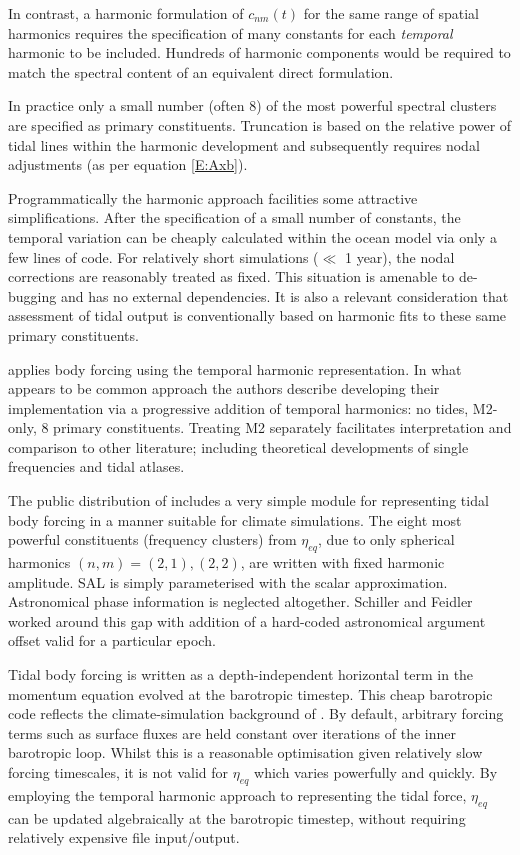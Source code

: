 In contrast, a harmonic formulation of $c_{nm}(t)$ for the same range of spatial harmonics requires the specification of many constants for each \emph{temporal} harmonic to be included.  
Hundreds of harmonic components \citep[pp3]{Desai:2006wo} would be required to match the spectral content of an equivalent direct formulation.


In practice only a small number (often 8) of the most powerful spectral clusters are specified as primary constituents.  
Truncation is based on the relative power of tidal lines within the harmonic development and subsequently requires nodal adjustments (as per equation \ref{E:Axb}).

Programmatically the harmonic approach facilities some attractive simplifications.  
After the specification of a small number of constants, the temporal variation can be cheaply calculated within the ocean model via only a few lines of code.   
For relatively short simulations ($\ll$ 1 year), the nodal corrections are reasonably treated as fixed.   This situation is amenable to de-bugging and has no external dependencies.
It is also a relevant consideration that assessment of tidal output is conventionally based on harmonic fits to these same primary constituents.

\citet{Arbic:2010us} applies body forcing using the temporal harmonic representation. In what appears to be common approach the authors describe developing their implementation via a progressive addition of temporal harmonics: no tides, M2-only, 8 primary constituents.  Treating M2 separately facilitates interpretation and comparison to other literature; including theoretical developments of single frequencies and tidal atlases.


The public distribution of \MOM{} includes a very simple module for representing tidal body forcing in a manner suitable for climate simulations\cite[pp263] {Griffies:2008vh}.
The eight most powerful constituents (frequency clusters) from $\eta_{eq}$, due to only spherical harmonics $(n,m) = (2,1) , (2,2)$, are written with fixed harmonic amplitude.  SAL is simply parameterised with the scalar approximation. 
Astronomical phase information is neglected altogether.
Schiller and Feidler \citep{Schiller:2007gk} worked around this gap with addition of a hard-coded astronomical argument offset valid for a particular epoch.

Tidal body forcing is written as a depth-independent horizontal term in the momentum equation evolved at the barotropic timestep.
This cheap barotropic code reflects the climate-simulation background of \MOM{}.  
By default, arbitrary forcing terms such as surface fluxes are held constant over iterations of the inner barotropic loop.  
Whilst this is a reasonable optimisation given relatively slow forcing timescales, it is not valid for $\eta_{eq}$ which varies powerfully and quickly.
By employing the temporal harmonic approach to representing the tidal force, $\eta_{eq}$ can be updated algebraically at the barotropic timestep, without requiring relatively expensive file input/output.



